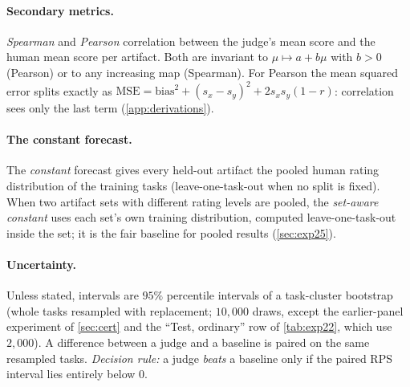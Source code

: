 \paragraph{Secondary metrics.}
\emph{Spearman} and \emph{Pearson} correlation between the judge's mean score and the human mean score per artifact.
Both are invariant to $\mu\mapsto a+b\mu$ with $b>0$ (Pearson) or to any increasing map (Spearman).
For Pearson the mean squared error splits exactly as $\mathrm{MSE}=\text{bias}^2+(s_x-s_y)^2+2s_xs_y(1-r)$: correlation sees only the last term (\cref{app:derivations}).

\paragraph{The constant forecast.}
The \emph{constant} forecast gives every held-out artifact the pooled human rating distribution of the training tasks (leave-one-task-out when no split is fixed).
When two artifact sets with different rating levels are pooled, the \emph{set-aware constant} uses each set's own training distribution, computed leave-one-task-out inside the set; it is the fair baseline for pooled results (\cref{sec:exp25}).

\paragraph{Uncertainty.}
Unless stated, intervals are $95\%$ percentile intervals of a task-cluster bootstrap (whole tasks resampled with replacement; $10{,}000$ draws, except the earlier-panel experiment of \cref{sec:cert} and the ``Test, ordinary'' row of \cref{tab:exp22}, which use $2{,}000$).
A difference between a judge and a baseline is paired on the same resampled tasks.
\emph{Decision rule:} a judge \emph{beats} a baseline only if the paired RPS interval lies entirely below $0$.
